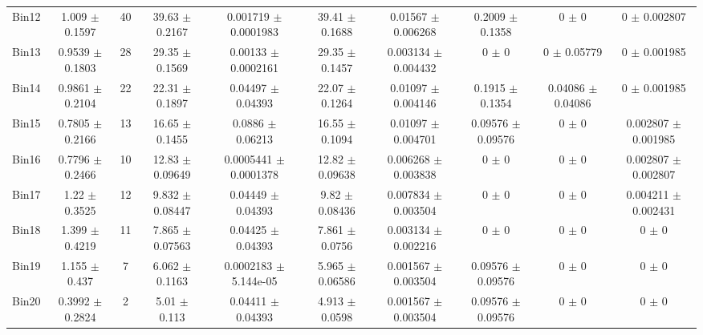 \begin{tabular}{@{\extracolsep{4pt}}lccccccccc@{}}
     Bin12 & 1.009 $\pm$ 0.1597 & 40 & 39.63 $\pm$ 0.2167 & 0.001719 $\pm$ 0.0001983 & 39.41 $\pm$ 0.1688 & 0.01567 $\pm$ 0.006268 & 0.2009 $\pm$ 0.1358 & 0 $\pm$ 0 & 0 $\pm$ 0.002807 \\ 
     Bin13 & 0.9539 $\pm$ 0.1803 & 28 & 29.35 $\pm$ 0.1569 & 0.00133 $\pm$ 0.0002161 & 29.35 $\pm$ 0.1457 & 0.003134 $\pm$ 0.004432 & 0 $\pm$ 0 & 0 $\pm$ 0.05779 & 0 $\pm$ 0.001985 \\ 
     Bin14 & 0.9861 $\pm$ 0.2104 & 22 & 22.31 $\pm$ 0.1897 & 0.04497 $\pm$ 0.04393 & 22.07 $\pm$ 0.1264 & 0.01097 $\pm$ 0.004146 & 0.1915 $\pm$ 0.1354 & 0.04086 $\pm$ 0.04086 & 0 $\pm$ 0.001985 \\ 
     Bin15 & 0.7805 $\pm$ 0.2166 & 13 & 16.65 $\pm$ 0.1455 & 0.0886 $\pm$ 0.06213 & 16.55 $\pm$ 0.1094 & 0.01097 $\pm$ 0.004701 & 0.09576 $\pm$ 0.09576 & 0 $\pm$ 0 & 0.002807 $\pm$ 0.001985 \\ 
     Bin16 & 0.7796 $\pm$ 0.2466 & 10 & 12.83 $\pm$ 0.09649 & 0.0005441 $\pm$ 0.0001378 & 12.82 $\pm$ 0.09638 & 0.006268 $\pm$ 0.003838 & 0 $\pm$ 0 & 0 $\pm$ 0 & 0.002807 $\pm$ 0.002807 \\ 
     Bin17 & 1.22 $\pm$ 0.3525 & 12 & 9.832 $\pm$ 0.08447 & 0.04449 $\pm$ 0.04393 & 9.82 $\pm$ 0.08436 & 0.007834 $\pm$ 0.003504 & 0 $\pm$ 0 & 0 $\pm$ 0 & 0.004211 $\pm$ 0.002431 \\ 
     Bin18 & 1.399 $\pm$ 0.4219 & 11 & 7.865 $\pm$ 0.07563 & 0.04425 $\pm$ 0.04393 & 7.861 $\pm$ 0.0756 & 0.003134 $\pm$ 0.002216 & 0 $\pm$ 0 & 0 $\pm$ 0 & 0 $\pm$ 0 \\ 
     Bin19 & 1.155 $\pm$ 0.437 & 7 & 6.062 $\pm$ 0.1163 & 0.0002183 $\pm$ 5.144e-05 & 5.965 $\pm$ 0.06586 & 0.001567 $\pm$ 0.003504 & 0.09576 $\pm$ 0.09576 & 0 $\pm$ 0 & 0 $\pm$ 0 \\ 
     Bin20 & 0.3992 $\pm$ 0.2824 & 2 & 5.01 $\pm$ 0.113 & 0.04411 $\pm$ 0.04393 & 4.913 $\pm$ 0.0598 & 0.001567 $\pm$ 0.003504 & 0.09576 $\pm$ 0.09576 & 0 $\pm$ 0 & 0 $\pm$ 0 \\ 
\hline\hline
  \end{tabular}
